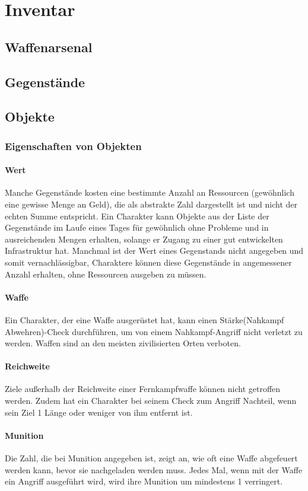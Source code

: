\chapter{Inventar}
\section{Waffenarsenal}
\section{Gegenstände}
\section{Objekte}
\subsection{Eigenschaften von Objekten}
\subsubsection{Wert}
Manche Gegenstände kosten eine bestimmte Anzahl an Ressourcen (gewöhnlich eine gewisse Menge an Geld), die als abstrakte Zahl dargestellt ist und nicht der echten Summe entspricht. Ein Charakter kann Objekte aus der Liste der Gegenstände im Laufe eines Tages für gewöhnlich ohne Probleme und in ausreichenden Mengen erhalten, solange er Zugang zu einer gut entwickelten Infrastruktur hat. 
Manchmal ist der Wert eines Gegenstands nicht angegeben und somit vernachlässigbar, Charaktere können diese Gegenstände in angemessener Anzahl erhalten, ohne Ressourcen ausgeben zu müssen.
\subsubsection{Waffe}
Ein Charakter, der eine Waffe ausgerüstet hat, kann einen Stärke(Nahkampf Abwehren)-Check durchführen, um von einem Nahkampf-Angriff nicht verletzt zu werden. Waffen sind an den meisten zivilisierten Orten verboten.
\subsubsection{Reichweite}
Ziele außerhalb der Reichweite einer Fernkampfwaffe können nicht getroffen werden. Zudem hat ein Charakter bei seinem Check zum Angriff Nachteil, wenn sein Ziel 1 Länge oder weniger von ihm entfernt ist.
\subsubsection{Munition}
Die Zahl, die bei Munition angegeben ist, zeigt an, wie oft eine Waffe abgefeuert werden kann, bevor sie nachgeladen werden muss. Jedes Mal, wenn mit der Waffe ein Angriff ausgeführt wird, wird ihre Munition um mindestens 1 verringert.
